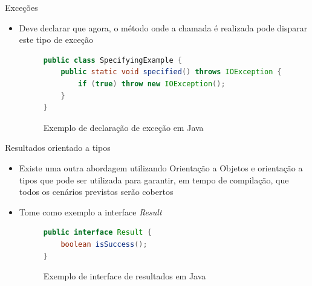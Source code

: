 \documentclass[brazilian]{beamer}
\begin{document}
\begin{frame}[fragile]{Exceções}
    \begin{itemize}
        \item Deve declarar que agora, o método onde a chamada é realizada pode disparar este tipo de exceção
        \begin{figure}[H]
            \centering
            \begin{lstlisting}[language=Java]
public class SpecifyingExample {
    public static void specified() throws IOException {
        if (true) throw new IOException();
    }
}
            \end{lstlisting}
            \caption{Exemplo de declaração de exceção em Java}
            \label{fig:java_declaring_exception}
        \end{figure}
    \end{itemize}
\end{frame}

\begin{frame}[fragile]{Resultados orientado a tipos}
    \begin{itemize}
        \item Existe uma outra abordagem utilizando Orientação a Objetos e orientação a tipos que pode ser utilizada para garantir, em tempo de compilação, que todos os cenários previstos serão cobertos
        \item Tome como exemplo a interface \emph{Result}
        \begin{figure}[H]
            \centering
            \begin{lstlisting}[language=Java]
public interface Result {
    boolean isSuccess();
}
            \end{lstlisting}
            \caption{Exemplo de interface de resultados em Java}
            \label{fig:java_result_interface}
        \end{figure}
    \end{itemize}
\end{frame}
\end{document}
